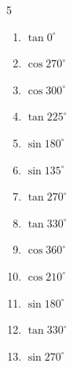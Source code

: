 \begin{multicols}{5}
\begin{enumerate}
  \item $\displaystyle \tan{0^\circ}$

        \phantom{$\displaystyle =0$}

  \item $\displaystyle \cos{270^\circ}$

        \phantom{$\displaystyle =0$}

  \item $\displaystyle \cos{300^\circ}$


  \item $\displaystyle \tan{225^\circ}$

        \phantom{$\displaystyle =1$}

  \item $\displaystyle \sin{180^\circ}$

        \phantom{$\displaystyle =0$}

  \item $\displaystyle \sin{135^\circ}$


  \item $\displaystyle \tan{270^\circ}$

        \phantom{$\displaystyle なし$}

  \item $\displaystyle \tan{330^\circ}$


  \item $\displaystyle \cos{360^\circ}$

        \phantom{$\displaystyle =1$}

  \item $\displaystyle \cos{210^\circ}$


  \item $\displaystyle \sin{180^\circ}$

        \phantom{$\displaystyle =0$}

\columnbreak %

  \item $\displaystyle \tan{330^\circ}$


  \item $\displaystyle \sin{270^\circ}$


\end{enumerate}
\end{multicols}
